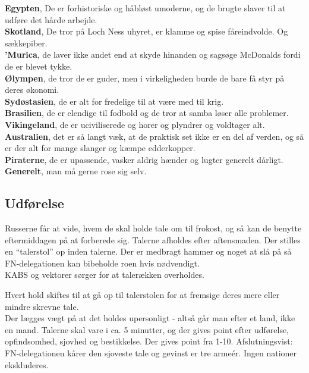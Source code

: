 \textbf{Egypten}, De er forhistoriske og håbløst umoderne, og de brugte slaver til at udføre det hårde arbejde.\\
\textbf{Skotland}, De tror på Loch Ness uhyret, er klamme og spise fåreindvolde. Og sækkepiber.\\
\textbf{'Murica}, de laver ikke andet end at skyde hinanden og sagsøge McDonalds fordi de er blevet tykke. \\
\textbf{Ølympen}, de tror de er guder, men i virkeligheden burde de bare få styr på deres økonomi.\\
\textbf{Sydøstasien}, de er alt for fredelige til at være med til krig. \\
\textbf{Brasilien}, de er elendige til fodbold og de tror at samba løser alle problemer. \\
\textbf{Vikingeland}, de er uciviliserede og horer og plyndrer og voldtager alt. \\
\textbf{Australien}, det er så langt væk, at de praktisk set ikke er en del af verden, og så er der alt for mange slanger og kæmpe edderkopper.\\
\textbf{Piraterne}, de er upassende, vasker aldrig hænder og lugter generelt dårligt.\\
\textbf{Generelt}, man må gerne rose sig selv.


\subsection*{Udførelse}
Russerne får at vide, hvem de skal holde tale om til frokost, og så kan de benytte eftermiddagen på at forberede sig. Talerne afholdes efter aftensmaden. Der stilles en ``talerstol'' op inden talerne. Der er medbragt hammer og noget at slå på så FN-delegationen kan bibeholde roen hvis nødvendigt.\\
KABS og vektorer sørger for at talerækken overholdes.

Hvert hold skiftes til at gå op til talerstolen for at fremsige deres mere eller mindre skrevne tale.\\
Der lægges vægt på at det holdes upersonligt - altså går man efter et land, ikke en mand. Talerne skal vare i ca. 5 minutter, og der gives point efter udførelse, opfindsomhed, sjovhed og bestikkelse. Der gives point fra 1-10. Afslutningsvist: FN-delegationen kårer den sjoveste tale og gevinst er tre armeér. Ingen nationer ekskluderes.

